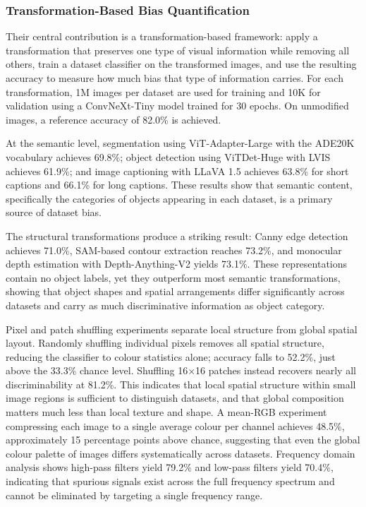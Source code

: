
\subsubsection*{Transformation-Based Bias Quantification}
\label{subsubsec:zeng_transformations}

Their central contribution is a transformation-based framework: apply a transformation that
preserves one type of visual information while removing all others, train a dataset
classifier on the transformed images, and use the resulting accuracy to measure how much
bias that type of information carries. For each transformation, 1M images per dataset are
used for training and 10K for validation using a ConvNeXt-Tiny model trained for 30
epochs. On unmodified images, a reference accuracy of 82.0\% is achieved.

At the semantic level, segmentation using ViT-Adapter-Large with the ADE20K vocabulary
achieves 69.8\%; object detection using ViTDet-Huge with LVIS achieves 61.9\%; and image
captioning with LLaVA 1.5 achieves 63.8\% for short captions and 66.1\% for long captions.
These results show that semantic content, specifically the categories of objects appearing
in each dataset, is a primary source of dataset bias.

The structural transformations produce a striking result: Canny edge detection achieves
71.0\%, SAM-based contour extraction reaches 73.2\%, and monocular depth estimation with
Depth-Anything-V2 yields 73.1\%. These representations contain no object labels, yet they
outperform most semantic transformations, showing that object shapes and spatial arrangements differ significantly across datasets and carry as much discriminative information
as object category.

Pixel and patch shuffling experiments separate local structure from global spatial layout.
Randomly shuffling individual pixels removes all spatial structure, reducing the
classifier to colour statistics alone; accuracy falls to 52.2\%, just above the 33.3\%
chance level. Shuffling 16$\times$16 patches instead recovers nearly all discriminability
at 81.2\%. This indicates that local spatial structure within small image regions is sufficient to
distinguish datasets, and that global composition matters much less than
local texture and shape. A mean-RGB experiment compressing each image to a single average
colour per channel achieves 48.5\%, approximately 15 percentage points above chance, suggesting
that even the global colour palette of images differs systematically across datasets.
Frequency domain analysis shows high-pass filters yield 79.2\% and low-pass filters yield
70.4\%, indicating that spurious signals exist across the full frequency spectrum and
cannot be eliminated by targeting a single frequency range.

